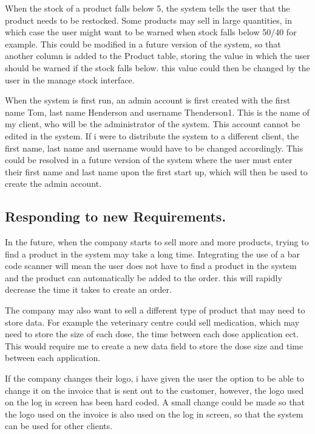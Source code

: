 When the stock of a product falls below 5, the system tells the user that the product needs to be restocked. Some products may sell in large quantities, in which case the user might want to be warned when stock falls below 50/40 for example. This could be modified in a future version of the system, so that another column is added to the Product table, storing the value in which the user should be warned if the stock falls below. this value could then be changed by the user in the manage stock interface.

When the system is first run, an admin account is first created with the first name Tom, last name Henderson and username Thenderson1. This is the name of my client, who will be the administrator of the system. This account cannot be edited in the system. If i were to distribute the system to a different client, the first name, last name and username would have to be changed accordingly. This could be resolved in a future version of the system where the user must enter their first name and last name upon the first start up, which will then be used to create the admin account.

\subsection{Responding to new Requirements.}

In the future, when the company starts to sell more and more products, trying to find a product in the system may take a long time. Integrating the use of a bar code scanner will mean the user does not have to find a product in the system and the product can automatically be added to the order. this will rapidly decrease the time it takes to create an order.

The company may also want to sell a different type of product that may need to store data. For example the veterinary centre could sell medication, which may need to store the size of each dose, the time between each dose application ect. This would require me to create a new data field to store the dose size and time between each application.

If the company changes their logo, i have given the user the option to be able to change it on the invoice that is sent out to the customer, however, the logo used on the log in screen has been hard coded. A small change could be made so that the logo used on the invoice is also used on the log in screen, so that the system can be used for other clients.

